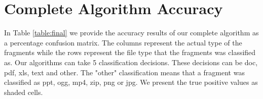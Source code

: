 

\section{Complete Algorithm Accuracy}\label{sec:6.3}
In Table \ref{table:final} we provide the accuracy results of our complete algorithm as a percentage confusion matrix. The columns represent the actual type of the fragments while the rows represent the file type that the fragments was classified as. Our algorithms can take 5 classification decisions. These decisions can be doc, pdf, xls, text and other. The "other" classification means that a fragment was classified as ppt, ogg, mp4, zip, png or jpg.  We present the true positive values as shaded cells.

